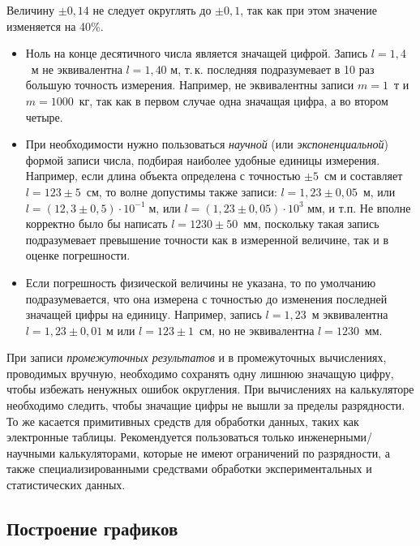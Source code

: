 \documentclass[10pt]{article}
\begin{document}
Величину $\pm0{,}14$ не следует округлять до $\pm0{,}1$, так как
при этом значение изменяется на 40\%.
\begin{itemize}
\item Ноль на конце десятичного числа является значащей цифрой. Запись $l=1{,}4$~м
не эквивалентна $l=1{,}40$ м, т.\,к. последняя подразумевает в 10
раз большую точность измерения. Например, не эквивалентны записи $m=1$~т
и $m=1000$~кг, так как в первом случае одна значащая цифра, а во
втором четыре.
\item При необходимости нужно пользоваться\emph{ научной} (или \emph{экспоненциальной})
формой записи числа, подбирая наиболее удобные единицы измерения.
Например, если длина объекта определена с точностью $\pm5$~см и
составляет $l=123\pm5$~см, то волне допустимы также записи: $l=1{,}23\pm0{,}05$~м,
или $l=\left(12{,}3\pm0{,}5\right)\cdot10^{-1}\;\text{м}$, или $l=\left(1{,}23\pm0{,}05\right)\cdot10^{3}\text{ мм}$,
и т.п. Не вполне корректно было бы написать $l=1230\pm50$~мм, поскольку
такая запись подразумевает превышение точности как в измеренной величине,
так и в оценке погрешности.
\item Если погрешность физической величины не указана, то по умолчанию подразумевается,
что она измерена с точностью до изменения последней значащей цифры
на единицу. Например, запись $l=1{,}23$~м эквивалентна $l=1{,}23\pm0{,}01$
м или $l=123\pm1$~см, но не эквивалентна $l=1230$~мм.
\end{itemize}
При записи \emph{промежуточных результатов} и в промежуточных вычислениях,
проводимых вручную, необходимо сохранять одну лишнюю значащую цифру,
чтобы избежать ненужных ошибок округления. При вычислениях на калькуляторе
необходимо следить, чтобы значащие цифры не вышли за пределы разрядности.
То же касается примитивных средств для обработки данных, таких как
электронные таблицы. Рекомендуется пользоваться только инженерными/научными
калькуляторами, которые не имеют ограничений по разрядности, а также
специализированными средствами обработки экспериментальных и статистических
данных.

\subsection{Построение графиков}
\end{document}
